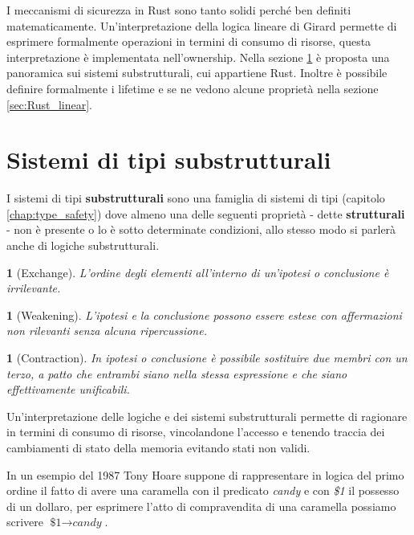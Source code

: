 \documentclass[Lau,binding=0.6cm]{sapthesis}
\newtheorem{lemma}[theorem]{}
\begin{document}
I meccanismi di sicurezza in Rust sono tanto solidi perché ben definiti matematicamente.
Un'interpretazione della logica lineare di Girard permette di esprimere formalmente operazioni in termini di consumo di risorse, questa interpretazione è implementata nell'ownership.
Nella sezione \ref{sec:Rust_substruct} è proposta una panoramica sui sistemi substrutturali, cui appartiene Rust. 
Inoltre è possibile definire formalmente i lifetime e se ne vedono alcune proprietà nella sezione \ref{sec:Rust_linear}.

\section{Sistemi di tipi substrutturali} \label{sec:Rust_substruct}

I sistemi di tipi \textbf{substrutturali} sono una famiglia di sistemi di tipi (capitolo \ref{chap:type_safety}) dove almeno una delle seguenti proprietà - dette \textbf{strutturali} - non è presente o lo è sotto determinate condizioni, allo stesso modo si parlerà anche di logiche substrutturali.

\begin{lemma}[Exchange] \label{lemma:exchange}
    L'ordine degli elementi all'interno di un'ipotesi o conclusione è irrilevante.
\end{lemma}

\begin{lemma}[Weakening] \label{lemma:weakening}
    L'ipotesi e la conclusione possono essere estese con affermazioni non rilevanti senza alcuna ripercussione. 
\end{lemma}

\begin{lemma}[Contraction] \label{lemma:contraction}
    In ipotesi o conclusione è possibile sostituire due membri con un terzo, a patto che entrambi siano nella stessa espressione e che siano effettivamente unificabili.
\end{lemma}

Un'interpretazione delle logiche e dei sistemi substrutturali permette di ragionare in termini di consumo di risorse, vincolandone l'accesso e tenendo traccia dei cambiamenti di stato della memoria evitando stati non validi. 

In un esempio del 1987 Tony Hoare suppone di rappresentare in logica del primo ordine il fatto di avere una caramella con il predicato \textit{candy} e con  \textit{\$1} il possesso di un dollaro, per esprimere l'atto di compravendita di una caramella possiamo scrivere $ \textit{\$1} \rightarrow \textit{candy} $.
\end{document}
